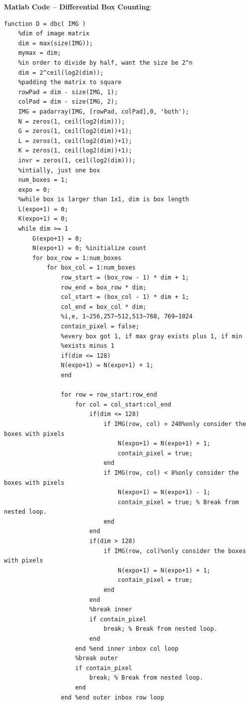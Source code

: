 \documentclass{article}
\begin{document}
\textbf{Matlab Code -- Differential Box Counting}:
\begin{lstlisting}
function D = dbc( IMG )
    %dim of image matrix
    dim = max(size(IMG));
    mymax = dim;
    %in order to divide by half, want the size be 2^n
    dim = 2^ceil(log2(dim));
    %padding the matrix to square
    rowPad = dim - size(IMG, 1);
    colPad = dim - size(IMG, 2);
    IMG = padarray(IMG, [rowPad, colPad],0, 'both');
    N = zeros(1, ceil(log2(dim)));
    G = zeros(1, ceil(log2(dim))+1);
    L = zeros(1, ceil(log2(dim))+1);
    K = zeros(1, ceil(log2(dim))+1);
    invr = zeros(1, ceil(log2(dim)));
    %intially, just one box
    num_boxes = 1;
    expo = 0;
    %while box is larger than 1x1, dim is box length
    L(expo+1) = 0;
    K(expo+1) = 0;
    while dim >= 1
        G(expo+1) = 0;
        N(expo+1) = 0; %initialize count
        for box_row = 1:num_boxes
            for box_col = 1:num_boxes
                row_start = (box_row - 1) * dim + 1;
                row_end = box_row * dim;
                col_start = (box_col - 1) * dim + 1;
                col_end = box_col * dim;
                %i,e, 1~256,257~512,513~768, 769~1024
                contain_pixel = false;
                %every box got 1, if max gray exists plus 1, if min
                %exists minus 1
                if(dim <= 128)
                N(expo+1) = N(expo+1) + 1;
                end
                
                for row = row_start:row_end
                    for col = col_start:col_end
                        if(dim <= 128)
                            if IMG(row, col) > 240%only consider the boxes with pixels
                                N(expo+1) = N(expo+1) + 1;
                                contain_pixel = true;
                            end
                            if IMG(row, col) < 8%only consider the boxes with pixels
                                N(expo+1) = N(expo+1) - 1;
                                contain_pixel = true; % Break from nested loop.
                            end
                        end
                        if(dim > 128)
                            if IMG(row, col)%only consider the boxes with pixels
                                N(expo+1) = N(expo+1) + 1;
                                contain_pixel = true;
                            end
                        end
                        %break inner
                        if contain_pixel
                            break; % Break from nested loop.
                        end
                    end %end inner inbox col loop
                    %break outer
                    if contain_pixel
                        break; % Break from nested loop.
                    end                   
                end %end outer inbox row loop
                

\end{lstlisting}
\end{document}
